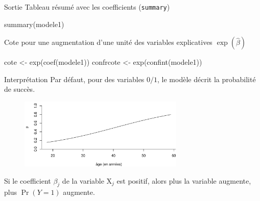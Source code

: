 \documentclass[
  ignorenonframetext,
]{beamer}
\newenvironment{Shaded}{\begin{snugshade}}{\end{snugshade}}
\newcommand{\FunctionTok}[1]{\textcolor[rgb]{0.28,0.35,0.67}{#1}}
\newcommand{\NormalTok}[1]{\textcolor[rgb]{0.00,0.23,0.31}{#1}}
\newcommand{\OtherTok}[1]{\textcolor[rgb]{0.00,0.23,0.31}{#1}}
\begin{document}
\begin{frame}[fragile]{Sortie}
\protect\hypertarget{sortie}{}
Tableau résumé avec les coefficients (\texttt{summary})

\begin{Shaded}
\begin{Highlighting}[numbers=left,,]
\FunctionTok{summary}\NormalTok{(modele1)}
\end{Highlighting}
\end{Shaded}

Cote pour une augmentation d'une unité des variables explicatives
\(\exp(\widehat{\beta})\)

\begin{Shaded}
\begin{Highlighting}[numbers=left,,]
\NormalTok{cote }\OtherTok{\textless{}{-}} \FunctionTok{exp}\NormalTok{(}\FunctionTok{coef}\NormalTok{(modele1))}
\NormalTok{confrcote }\OtherTok{\textless{}{-}} \FunctionTok{exp}\NormalTok{(}\FunctionTok{confint}\NormalTok{(modele1))}
\end{Highlighting}
\end{Shaded}
\end{frame}

\begin{frame}{Interprétation}
\protect\hypertarget{interpruxe9tation}{}
Par défaut, pour des variables \(0/1\), le modèle décrit la probabilité
de succès.

\begin{figure}

{\centering \includegraphics[width=0.7\textwidth,height=\textheight]{MATH60602-diapos6_files/figure-beamer/logitplot2-1.pdf}

}

\end{figure}

Si le coefficient \(\beta_j\) de la variable \(\mathrm{X}_j\) est
positif, alors plus la variable augmente, plus \(\Pr(Y=1)\) augmente.
\end{frame}
\end{document}
